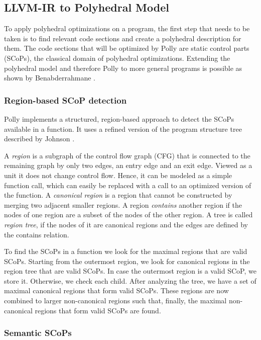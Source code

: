 \documentclass{acm_proc_article-sp}
\begin{document}
\subsection{LLVM-IR to Polyhedral Model}

To apply polyhedral optimizations on a program, the first step that needs to be
taken is to find relevant code sections and create a polyhedral description for
them. The code sections that will be optimized by Polly are static
control parts (SCoPs), the classical domain of polyhedral optimizations.
Extending the polyhedral model and therefore Polly to more general programs is
possible as shown by Benabderrahmane \cite{benabderrahmane.10.cc}.

\subsubsection{Region-based SCoP detection}
Polly implements a structured, region-based approach to detect
the SCoPs available in a function. It uses a refined version of the program
structure tree described by Johnson \cite{Johnson}.

A \emph{region} is a subgraph of the control flow graph (CFG) that is connected to the
remaining graph by only two edges, an entry edge and an exit edge.  Viewed as a
unit it does not change control flow. Hence, it can be modeled as a
simple function call, which can easily be replaced with a call to an optimized
version of the function.  A \emph{canonical region} is a region that cannot be
constructed by merging two adjacent smaller regions. A region \emph{contains}
another region if the nodes of one region are a subset of the nodes of the other
region. A tree is called \emph{region tree}, if the nodes of it are canonical regions
and the edges are defined by the contains relation.

To find the SCoPs in a function we look for the maximal regions that are valid
SCoPs. Starting from the outermost region, we look for canonical regions in the
region tree that are valid SCoPs. In case the outermost region is a valid SCoP,
we store it. Otherwise, we check each child. After analyzing the tree, we have a
set of maximal canonical regions that form valid SCoPs. These regions are now
combined to larger non-canonical regions such that, finally, the maximal 
non-canonical regions that form valid SCoPs are found.

\subsubsection{Semantic SCoPs}
\end{document}
